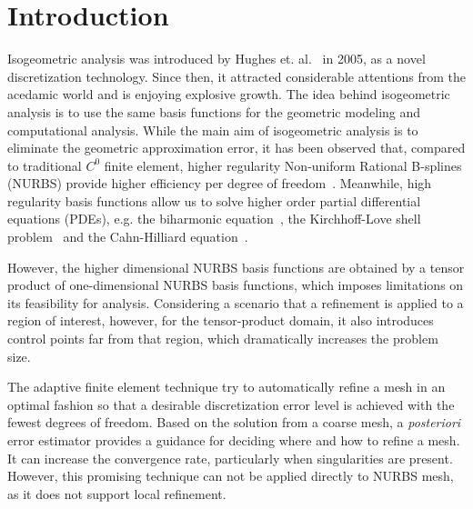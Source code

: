 \documentclass[preprint,12pt]{elsarticle}
\theoremstyle{remark}
\begin{document}
\linenumbers

\section{Introduction}
Isogeometric analysis was introduced by Hughes et. al.~\cite{HUGHES20054135} in 2005, as a novel discretization technology. Since then, it attracted considerable attentions from the acedamic world and is enjoying explosive growth. The idea behind isogeometric analysis is to use the same basis functions for the geometric modeling and computational analysis. While the main aim of isogeometric analysis is to eliminate the geometric approximation error, it has been observed that, compared to traditional $C^0$ finite element, higher regularity Non-uniform Rational B-splines (NURBS) provide higher efficiency per degree of freedom~\cite{bazilevs2006isogeometric, da2011some, da2014mathematical}. Meanwhile, high regularity basis functions allow us to solve higher order partial differential equations (PDEs), e.g. the biharmonic equation~\cite{moore2017discontinuous, kapl_isogeometric_2015, kapl_isogeometric_2017}, the Kirchhoff-Love shell problem~\cite{kiendl2009isogeometric, kiendl2010bending, kiendl2015isogeometric} and the Cahn-Hilliard equation~\cite{gomez2008isogeometric, borden2012phase, borden2014higher}.\par

However, the higher dimensional NURBS basis functions are obtained by a tensor product of one-dimensional NURBS basis functions, which imposes limitations on its feasibility for analysis. Considering a scenario that a refinement is applied to a region of interest, however, for the tensor-product domain, it also introduces control points far from that region, which dramatically increases the problem size. \par

The adaptive finite element technique try to automatically refine a mesh in an optimal fashion so that a desirable discretization error level is achieved with the fewest degrees of freedom. Based on the solution from a coarse mesh, a \textit{posteriori} error estimator provides a guidance for deciding where and how to refine a mesh. It can increase the convergence rate, particularly when singularities are present. However, this promising technique can not be applied directly to NURBS mesh, as it does not support local refinement.\par
\end{document}
